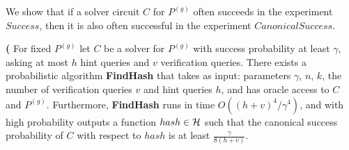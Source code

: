 We show that if a solver circuit $C$ for $P^{(g)}$ often succeeds in the experiment $Success$, then it is
also often successful in the experiment $CanonicalSuccess$.

\begin{lemma}\textbf{(}
\label{lemma:hash_function_probability}
For fixed $P^{(g)}$ let $C$ be a solver for $P^{(g)}$ with success probability at least $\gamma$,
asking at most $h$ hint queries and $v$ verification queries.
There exists a probabilistic algorithm \textbf{FindHash} that takes as input:
parameters $\gamma$, $n$, $k$, the number of verification queries $v$ and hint queries $h$, and has
oracle access to $C$ and $P^{(g)}$. Furthermore, \textbf{FindHash} runs in time $O((h+v)^4/\gamma^4)$,
and with high probability outputs a function $hash \in \mathcal{H}$
such that the canonical success probability of $C$ with respect to $hash$ is at least $\frac{\gamma}{8(h+v)}$.
\end{lemma}
%

